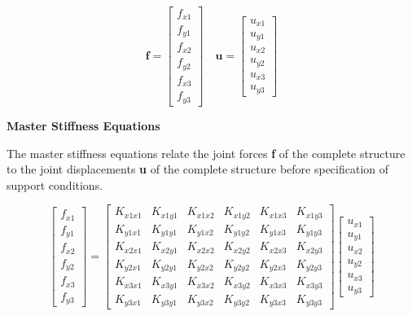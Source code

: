 \documentclass{article}
\begin{document}
\begin{multicols*}{2}
    \begin{equation*}
        \textbf{f} = 
        \begin{bmatrix}
            f_{x1}\\
            f_{y1}\\
            f_{x2}\\
            f_{y2}\\
            f_{x3}\\
            f_{y3}
        \end{bmatrix}
        \quad
        \textbf{u} = 
        \begin{bmatrix}
            u_{x1}\\
            u_{y1}\\
            u_{x2}\\
            u_{y2}\\
            u_{x3}\\
            u_{y3}
        \end{bmatrix}
    \end{equation*}

    \textbf{Master Stiffness Equations}\par 
    The master stiffness equations relate the joint forces \textbf{f} of the
    complete structure to the joint displacements \textbf{u} of the complete
    structure before specification of support conditions.

    \begin{equation*} 
        \begin{bmatrix}
            f_{x1}\\
            f_{y1}\\
            f_{x2}\\
            f_{y2}\\
            f_{x3}\\
            f_{y3}
        \end{bmatrix}
        =
        \begin{bmatrix}
            K_{x1x1} & K_{x1y1} & K_{x1x2} & K_{x1y2} & K_{x1x3} & K_{x1y3}\\
            K_{y1x1} & K_{y1y1} & K_{y1x2} & K_{y1y2} & K_{y1x3} & K_{y1y3}\\
            K_{x2x1} & K_{x2y1} & K_{x2x2} & K_{x2y2} & K_{x2x3} & K_{x2y3}\\
            K_{y2x1} & K_{y2y1} & K_{y2x2} & K_{y2y2} & K_{y2x3} & K_{y2y3}\\
            K_{x3x1} & K_{x3y1} & K_{x3x2} & K_{x3y2} & K_{x3x3} & K_{x3y3}\\
            K_{y3x1} & K_{y3y1} & K_{y3x2} & K_{y3y2} & K_{y3x3} & K_{y3y3}
        \end{bmatrix}
        \begin{bmatrix}
            u_{x1}\\
            u_{y1}\\
            u_{x2}\\
            u_{y2}\\
            u_{x3}\\
            u_{y3}
        \end{bmatrix} 
    \end{equation*}


\end{multicols*}
\end{document}
